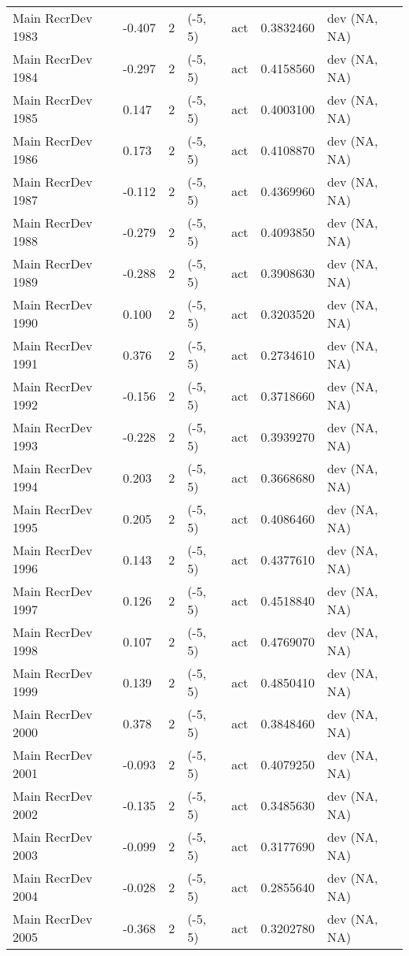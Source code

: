 \documentclass[11pt,
  english,
  a4paper,
]{article}
\begin{document}
\begin{landscape}
\begin{longtable}[t]{>{\raggedright\arraybackslash}p{8.5cm}lllll>{\raggedright\arraybackslash}p{4cm}}
Main RecrDev 1983 & -0.407 & 2 & (-5, 5) & act & 0.3832460 & dev (NA, NA)\\
Main RecrDev 1984 & -0.297 & 2 & (-5, 5) & act & 0.4158560 & dev (NA, NA)\\
Main RecrDev 1985 & 0.147 & 2 & (-5, 5) & act & 0.4003100 & dev (NA, NA)\\
Main RecrDev 1986 & 0.173 & 2 & (-5, 5) & act & 0.4108870 & dev (NA, NA)\\
Main RecrDev 1987 & -0.112 & 2 & (-5, 5) & act & 0.4369960 & dev (NA, NA)\\
Main RecrDev 1988 & -0.279 & 2 & (-5, 5) & act & 0.4093850 & dev (NA, NA)\\
Main RecrDev 1989 & -0.288 & 2 & (-5, 5) & act & 0.3908630 & dev (NA, NA)\\
Main RecrDev 1990 & 0.100 & 2 & (-5, 5) & act & 0.3203520 & dev (NA, NA)\\
Main RecrDev 1991 & 0.376 & 2 & (-5, 5) & act & 0.2734610 & dev (NA, NA)\\
Main RecrDev 1992 & -0.156 & 2 & (-5, 5) & act & 0.3718660 & dev (NA, NA)\\
Main RecrDev 1993 & -0.228 & 2 & (-5, 5) & act & 0.3939270 & dev (NA, NA)\\
Main RecrDev 1994 & 0.203 & 2 & (-5, 5) & act & 0.3668680 & dev (NA, NA)\\
Main RecrDev 1995 & 0.205 & 2 & (-5, 5) & act & 0.4086460 & dev (NA, NA)\\
Main RecrDev 1996 & 0.143 & 2 & (-5, 5) & act & 0.4377610 & dev (NA, NA)\\
Main RecrDev 1997 & 0.126 & 2 & (-5, 5) & act & 0.4518840 & dev (NA, NA)\\
Main RecrDev 1998 & 0.107 & 2 & (-5, 5) & act & 0.4769070 & dev (NA, NA)\\
Main RecrDev 1999 & 0.139 & 2 & (-5, 5) & act & 0.4850410 & dev (NA, NA)\\
Main RecrDev 2000 & 0.378 & 2 & (-5, 5) & act & 0.3848460 & dev (NA, NA)\\
Main RecrDev 2001 & -0.093 & 2 & (-5, 5) & act & 0.4079250 & dev (NA, NA)\\
Main RecrDev 2002 & -0.135 & 2 & (-5, 5) & act & 0.3485630 & dev (NA, NA)\\
Main RecrDev 2003 & -0.099 & 2 & (-5, 5) & act & 0.3177690 & dev (NA, NA)\\
Main RecrDev 2004 & -0.028 & 2 & (-5, 5) & act & 0.2855640 & dev (NA, NA)\\
Main RecrDev 2005 & -0.368 & 2 & (-5, 5) & act & 0.3202780 & dev (NA, NA)\\

\end{longtable}
\end{landscape}
\end{document}
